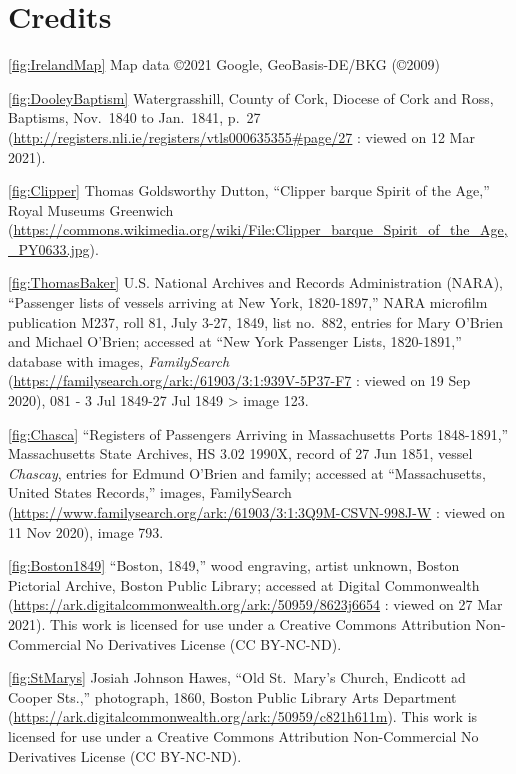 
\chapter{Credits}
\raggedright
\nonzeroparskip
\small

\ref{fig:IrelandMap} Map data \copyright 2021 Google, GeoBasis-DE/BKG (\copyright 2009)

\ref{fig:DooleyBaptism} Watergrasshill, County of Cork, Diocese of Cork and Ross, Baptisms, Nov.\ 1840 to Jan.\ 1841, p.\ 27 (\url{http://registers.nli.ie/registers/vtls000635355\#page/27} : viewed on 12 Mar 2021).

\ref{fig:Clipper} Thomas Goldsworthy Dutton, ``Clipper barque Spirit of the Age,'' Royal Museums Greenwich (\url{https://commons.wikimedia.org/wiki/File:Clipper_barque_Spirit_of_the_Age,_PY0633.jpg}).

\ref{fig:ThomasBaker} U.S. National Archives and Records Administration (NARA), ``Passenger lists of vessels arriving at New York, 1820-1897,'' NARA microfilm publication M237, roll 81, July 3-27, 1849, list no.\ 882, entries for Mary O'Brien and Michael O'Brien; accessed at ``New York Passenger Lists, 1820-1891,'' database with images, \textit{FamilySearch} (\url{https://familysearch.org/ark:/61903/3:1:939V-5P37-F7} : viewed on 19 Sep 2020), 081 - 3 Jul 1849-27 Jul 1849 > image 123.

\ref{fig:Chasca} ``Registers of Passengers Arriving in Massachusetts Ports 1848-1891,'' Massachusetts State Archives, HS 3.02 1990X, record of 27 Jun 1851, vessel \textit{Chascay}, entries for Edmund O'Brien and family; accessed at ``Massachusetts, United States Records,'' images, FamilySearch (\url{https://www.familysearch.org/ark:/61903/3:1:3Q9M-CSVN-998J-W} : viewed on 11 Nov 2020), image 793.

\ref{fig:Boston1849} ``Boston, 1849,'' wood engraving, artist unknown, Boston Pictorial Archive, Boston Public Library; accessed at Digital Commonwealth (\url{https://ark.digitalcommonwealth.org/ark:/50959/8623j6654} : viewed on 27 Mar 2021). This work is licensed for use under a Creative Commons Attribution Non-Commercial No Derivatives License (CC BY-NC-ND).

\ref{fig:StMarys} Josiah Johnson Hawes, ``Old St.\ Mary's Church, Endicott ad Cooper Sts.,'' photograph, 1860, Boston Public Library Arts Department (\url{https://ark.digitalcommonwealth.org/ark:/50959/c821h611m}). This work is licensed for use under a Creative Commons Attribution Non-Commercial No Derivatives License (CC BY-NC-ND).

